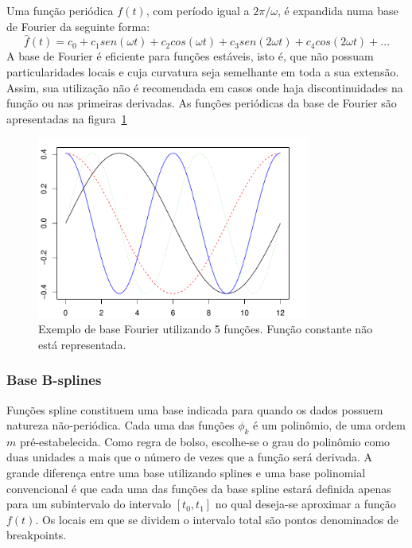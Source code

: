 \documentclass[
	12pt,				%
	openright,			%
	oneside,			%
	a4paper,			%
	english,			%
	brazil				%
	]{dissertacao-ufrgs-abntex2}
\begin{document}
Uma função periódica $f(t)$, com período igual a $2\pi/\omega$,
é expandida numa base de Fourier da seguinte forma:
\begin{equation}
\hat{f}(t)=c_{0}+c_{1}sen(\omega t)+c_{2}cos(\omega t)+c_{3}sen(2\omega t)+c_{4}cos(2\omega t)+...
\end{equation}
A base de Fourier é eficiente para funções estáveis, isto é, que não
possuam particularidades locais e cuja curvatura seja semelhante em
toda a sua extensão. Assim, sua utilização não é recomendada em casos
onde haja discontinuidades na função ou nas primeiras derivadas. As funções periódicas da base de Fourier são apresentadas na figura~\ref{fig-base-fourier}
\begin{figure}[h!] 
  \centering
    \includegraphics[width=0.8\textwidth]{anexos/base_fourier}
  \caption{Exemplo de base Fourier utilizando 5 funções. Função constante não está representada.}
  \label{fig-base-fourier}
\end{figure}

\subsubsection*{Base B-splines} \label{sub:Base-B-splines}

Funções spline constituem uma base indicada para quando os dados possuem natureza não-periódica. 
Cada uma das funções $\phi_k$ é um polinômio, de uma ordem $m$ pré-estabelecida. 
Como regra de bolso, escolhe-se o grau do polinômio como duas unidades a mais que o número de vezes que a função será derivada.
A grande diferença entre uma base utilizando splines e uma base polinomial convencional é que cada uma das funções da base spline estará definida apenas para um subintervalo do intervalo $[t_0,t_1]$ no qual  deseja-se aproximar a função $f(t)$.
Os locais em que se dividem o intervalo total são pontos denominados de breakpoints.
\end{document}
